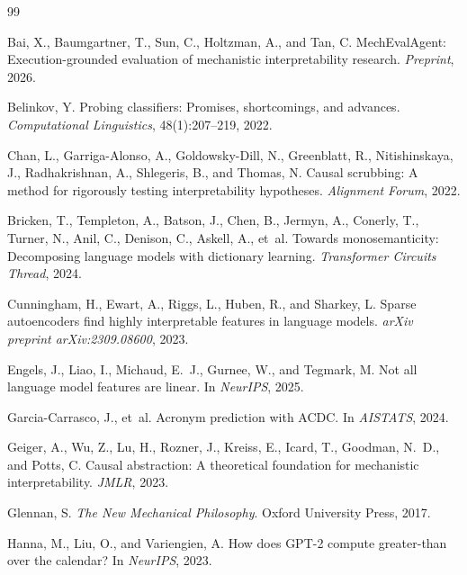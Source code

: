 \documentclass[10pt]{article}
\begin{document}
\begin{thebibliography}{99}

Bai, X., Baumgartner, T., Sun, C., Holtzman, A., and Tan, C.
\newblock MechEvalAgent: Execution-grounded evaluation of mechanistic interpretability research.
\newblock \emph{Preprint}, 2026.

Belinkov, Y.
\newblock Probing classifiers: Promises, shortcomings, and advances.
\newblock \emph{Computational Linguistics}, 48(1):207--219, 2022.

Chan, L., Garriga-Alonso, A., Goldowsky-Dill, N., Greenblatt, R., Nitishinskaya, J., Radhakrishnan, A., Shlegeris, B., and Thomas, N.
\newblock Causal scrubbing: A method for rigorously testing interpretability hypotheses.
\newblock \emph{Alignment Forum}, 2022.

Bricken, T., Templeton, A., Batson, J., Chen, B., Jermyn, A., Conerly, T., Turner, N., Anil, C., Denison, C., Askell, A., et~al.
\newblock Towards monosemanticity: Decomposing language models with dictionary learning.
\newblock \emph{Transformer Circuits Thread}, 2024.

Cunningham, H., Ewart, A., Riggs, L., Huben, R., and Sharkey, L.
\newblock Sparse autoencoders find highly interpretable features in language models.
\newblock \emph{arXiv preprint arXiv:2309.08600}, 2023.

Engels, J., Liao, I., Michaud, E.~J., Gurnee, W., and Tegmark, M.
\newblock Not all language model features are linear.
\newblock In \emph{NeurIPS}, 2025.

Garcia-Carrasco, J., et~al.
\newblock Acronym prediction with ACDC.
\newblock In \emph{AISTATS}, 2024.

Geiger, A., Wu, Z., Lu, H., Rozner, J., Kreiss, E., Icard, T., Goodman, N.~D., and Potts, C.
\newblock Causal abstraction: A theoretical foundation for mechanistic interpretability.
\newblock \emph{JMLR}, 2023.

Glennan, S.
\newblock \emph{The New Mechanical Philosophy}.
\newblock Oxford University Press, 2017.

Hanna, M., Liu, O., and Variengien, A.
\newblock How does {GPT}-2 compute greater-than over the calendar?
\newblock In \emph{NeurIPS}, 2023.


\end{thebibliography}
\end{document}
